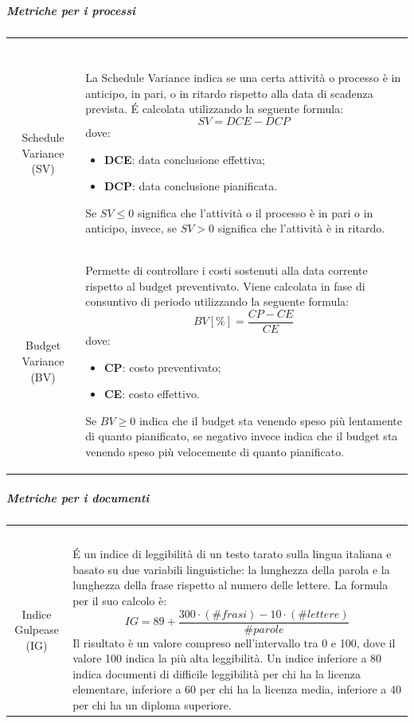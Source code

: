 \pagebreak
\subparagraph{Metriche per i processi}
	\renewcommand{\arraystretch}{1.5}
	\begin{center}
	\begin{tabular}{ c | L{12cm} }
		\textcolor{white}{\textbf{Nome}} & \centerline{\textcolor{white}{\textbf{Descrizione}}} \\
		Schedule Variance (SV)  & La Schedule Variance indica se una certa attività o processo è in anticipo, in pari, o in ritardo rispetto alla data di scadenza prevista. \'E calcolata utilizzando la seguente formula: \newline
\[ SV = DCE-DCP\]
dove: \begin{itemize}
\item \textbf{DCE}: data conclusione effettiva;
\item \textbf{DCP}: data conclusione pianificata.
\end{itemize}
Se $SV \leq 0$ significa che l’attività o il processo è in pari o in anticipo, invece, se $SV > 0$ significa che l’attività è in ritardo. \\	
		Budget Variance (BV) & Permette di controllare i costi sostenuti alla data corrente rispetto al budget preventivato. Viene calcolata in fase di consuntivo di periodo utilizzando la seguente formula: \newline
		\[ BV[\%] = \frac{CP-CE}{CE} \]		
dove: \begin{itemize}
\item \textbf{CP}: costo preventivato;
\item \textbf{CE}: costo effettivo.
\end{itemize}
Se $BV \geq 0$ indica che il budget sta venendo speso più lentamente di quanto pianificato, se negativo invece indica che il budget sta venendo speso più velocemente di quanto pianificato.
	\end{tabular}
	\end{center}
\pagebreak
\subparagraph{Metriche per i documenti}
	\renewcommand{\arraystretch}{1.5}
	\begin{center}
	\begin{tabular}{ c | L{11cm} }
		\textcolor{white}{\textbf{Nome}} & \centerline{\textcolor{white}{\textbf{Descrizione}}} \\
		Indice Gulpease (IG)  & \'E un indice di leggibilità di un testo tarato sulla lingua italiana e basato su due variabili linguistiche: la lunghezza della parola e la lunghezza della frase rispetto al numero delle lettere. La formula per il suo calcolo è: \newline
\[ IG = 89 + \frac{300 \cdot (\#frasi) - 10 \cdot (\#lettere)}{\#parole} \] \newline
Il risultato è un valore compreso nell'intervallo tra 0 e 100, dove il valore 100 indica la più alta leggibilità. Un indice inferiore a 80 indica documenti di difficile leggibilità per chi ha la licenza elementare, inferiore a 60 per chi ha la licenza media, inferiore a 40 per chi ha un diploma superiore.
	\\
	\end{tabular}
	\end{center}	

